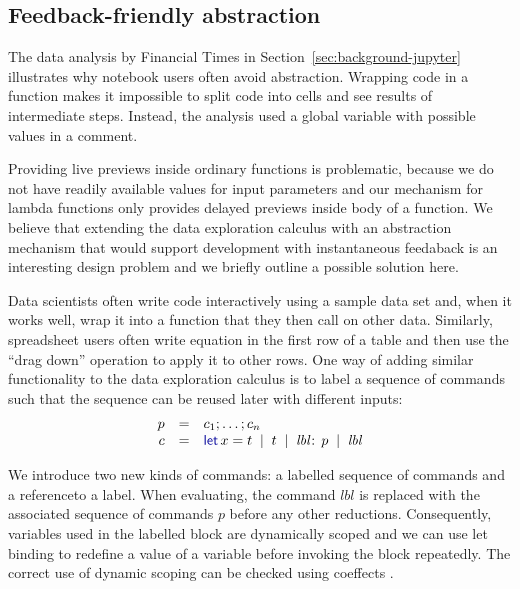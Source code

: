\documentclass[acmsmall,anonymous,fleqn]{acmart}\settopmatter{printfolios=false,printccs=false,printacmref=false}
\theoremstyle{plain}
\theoremstyle{definition}
\newcommand{\lsep}{\;\;|\;\;}
\newcommand{\kvd}[1]{\textnormal{\textcolor{kvdclr}{\sffamily #1}}}
\begin{document}

\subsection{Feedback-friendly abstraction}
\label{sec:extra-abstraction}

The data analysis by Financial Times in Section~\ref{sec:background-jupyter} illustrates why
notebook users often avoid abstraction. Wrapping code in a function makes it impossible to
split code into cells and see results of intermediate steps. Instead, the analysis used a
global variable with possible values in a comment.

Providing live previews inside ordinary functions is problematic, because we do not have readily
available values for input parameters and our mechanism for lambda functions only provides
delayed previews inside body of a function. We believe that extending the data exploration calculus
with an abstraction mechanism that would support development with instantaneous feedaback is an
interesting design problem and we briefly outline a possible solution here.

Data scientists often write code interactively using a sample data set and, when it works well,
wrap it into a function that they then call on other data. Similarly, spreadsheet users
often write equation in the first row of a table and then use the ``drag down'' operation to
apply it to other rows. One way of adding similar functionality to the data exploration calculus
is to label a sequence of commands such that the sequence can be reused later with different
inputs:
%
\begin{equation*}
\begin{array}{rcl}
p &=& c_1; \ldots; c_n\\
c &=& \kvd{let}\,x=t \lsep t \lsep \textit{lbl}\!:\,p \lsep \textit{lbl}
\end{array}
\end{equation*}

\noindent
We introduce two new kinds of commands: a labelled sequence of commands and a referenceto a label.
When evaluating, the command $\textit{lbl}$ is replaced with the associated sequence of
commands $p$ before any other reductions. Consequently, variables used in the labelled block are
dynamically scoped and we can use let binding to redefine a value of a variable before invoking
the block repeatedly. The correct use of dynamic scoping can be checked using
coeffects \cite{coeffects}.
\end{document}
